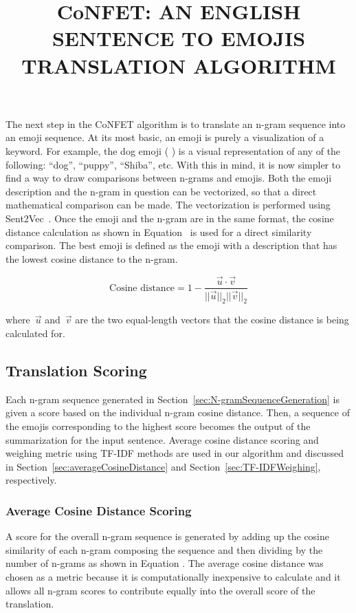 \documentclass{article}[10]
\newcommand*{\img}[1]{%
  \raisebox{-.3\baselineskip}{%
    \texttt{[image: \#1]}%
  }%
} \title{{CoNFET:} AN ENGLISH SENTENCE TO EMOJIS TRANSLATION ALGORITHM}
\begin{document}
The next step in the CoNFET algorithm is to translate an n-gram sequence into an
emoji sequence. At its most basic, an emoji is purely a visualization of a
keyword. For example, the dog emoji (\img{emojis/1f415.png}) is a visual
representation of any of the following: ``dog'', ``puppy'', ``Shiba'', etc. With
this in mind, it is now simpler to find a way to draw comparisons between
n-grams and emojis. Both the emoji description and the n-gram in question can be
vectorized, so that a direct mathematical comparison can be made. The
vectorization is performed using Sent2Vec~\cite{pg2017unsu}. Once the emoji and
the n-gram are in the same format, the cosine distance calculation as shown in
Equation~ is used for a direct similarity comparison. The best
emoji is defined as the emoji with a description that has the lowest cosine
distance to the n-gram.

\begin{equation}
   \textrm{Cosine distance} = 1 - \frac{\vec{u} \cdot \vec{v}}{||\vec{u}||_{2}||\vec{v}||_{2}}\label{eq:cos}
\end{equation}

where~\(\vec{u}\) and~\(\vec{v}\) are the two equal-length vectors that the
cosine distance is being calculated for.

\subsection{Translation Scoring\label{sec:translationScoring}}

Each n-gram sequence generated in Section~\ref{sec:N-gramSequenceGeneration} is
given a score based on the individual n-gram cosine distance. Then, a sequence
of the emojis corresponding to the highest score becomes the output of the
summarization for the input sentence. Average cosine distance scoring and
weighing metric using TF-IDF methods are used in our algorithm and discussed in
Section~\ref{sec:averageCosineDistance} and Section~\ref{sec:TF-IDFWeighing},
respectively.

\subsubsection{Average Cosine Distance Scoring\label{sec:averageCosineDistance}}

A score for the overall n-gram sequence is generated by adding up the cosine
similarity of each n-gram composing the sequence and then dividing by the number
of n-grams as shown in Equation . The average
cosine distance was chosen as a metric because it is computationally inexpensive
to calculate and it allows all n-gram scores to contribute equally into the
overall score of the translation.
\end{document}
